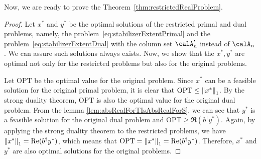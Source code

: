 \documentclass[a4paper, onecolumn, 11pt, longbibliography]{quantumarticle}
\begin{document}
Now, we are ready to prove the Theorem~\ref{thm:restrictedRealProblem}.

\restrictedRealProblem*
\begin{proof}
  Let $x^*$ and $y^*$ be the optimal solutions
  of the restricted primal and dual problems,
  namely, the problem~\eqref{eq:stabilizerExtentPrimal}
  and the problem~\eqref{eq:stabilizerExtentDual}
  with the column set $\calA'_n$ instead of $\calA_n$.
  We can assure such solutions always exists.
  Now, we show that the $x^*, y^*$ are
  optimal not only for the restricted problems
  but also for the original problems.

  Let $\mathrm{OPT}$ be the optimal value for the original problem.
  Since $x^*$ can be a feasible solution for the original primal problem,
  it is clear that $\mathrm{OPT} \leq \norm{x^*}_1$.
  By the strong duality theorem,
  $\mathrm{OPT}$ is also the optimal value
  for the original dual problem.
  From the lemma \ref{lem:absRealForTIsAbsRealForS},
  we can see that $y^*$ is a feasible solution
  for the original dual problem and $\mathrm{OPT} \geq \Re(b^\dagger y^*)$.
  Again, by applying the strong duality theorem
  to the restricted problems,
  we have $\norm{x^*}_1 = \Re(b^\dagger y^*)$,
  which means that $\mathrm{OPT} = \norm{x^*}_1 = \Re(b^\dagger y^*)$.
  Therefore, $x^*$ and $y^*$ are also optimal solutions
  for the original problems.
\end{proof}
\end{document}
